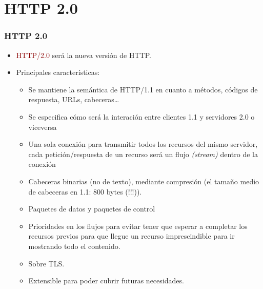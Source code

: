\documentclass[hyperref={pdfpagelabels=true},ucs]{beamer}
\newcommand{\res}[1]{\textcolor{darkred}{#1}}
\begin{document}
\section{HTTP 2.0}



\begin{frame}[fragile]
\frametitle{HTTP 2.0}


\begin{itemize}
\item \res{HTTP/2.0} será la nueva versión de HTTP.
\item Principales características:
  \begin{itemize}
  \item Se mantiene la semántica de HTTP/1.1 en cuanto a métodos,
    códigos de respuesta, URLs, cabeceras\ldots
  \item Se especifica cómo será la interación entre clientes 1.1 y
    servidores 2.0 o viceversa
  \item Una sola conexión para transmitir todos los recursos del mismo
    servidor, cada petición/respuesta de un recurso será un flujo
    \emph{(stream)} dentro de la conexión
  \item Cabeceras binarias (no de texto), mediante compresión (el tamaño
    medio de cabeceras en 1.1: 800 bytes (!!!)).
  \item Paquetes de datos y paquetes de control
  \item Prioridades en los flujos para evitar tener que esperar a
    completar los recursos previos para que llegue un recurso
    imprescindible para ir mostrando todo el contenido.
  \item Sobre TLS.
  \item Extensible para poder cubrir futuras necesidades.
  \end{itemize}
\end{itemize}

\end{frame}



\end{document}

